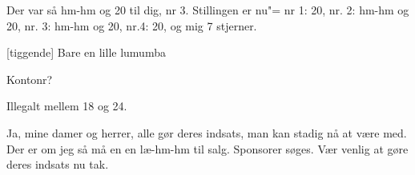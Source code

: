 \documentclass[a4paper,11pt]{article}
\begin{document}
\begin{sketch}
 Der var så hm-hm og 20 til dig, nr 3.  Stillingen er nu"= nr
1: 20, nr. 2: hm-hm og 20, nr. 3: hm-hm og 20, nr.4: 20, og
mig 7 stjerner.

[tiggende] Bare en lille lumumba

 Kontonr?


 Illegalt mellem 18 og 24.

 Ja, mine damer og herrer, alle gør deres indsats, man kan
stadig nå at være med.  Der er om jeg så må en en læ-hm-hm til salg.
Sponsorer søges.  Vær venlig at gøre deres indsats nu tak.


\end{sketch}
\end{document}
